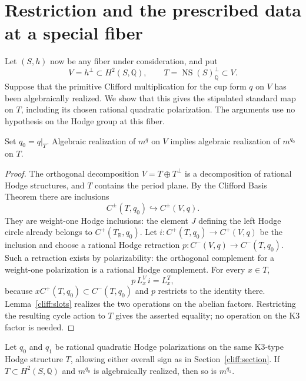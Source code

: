 \section{Restriction and the prescribed data at a special fiber}
\label{data:section}

Let $(S,h)$ now be any fiber under consideration, and put
\[
 V=h^\perp\subset H^2(S,\mathbb Q),\qquad
 T=\operatorname{NS}(S)_{\mathbb Q}^{\perp}\subset V.
\]
Suppose that the primitive Clifford multiplication for the cup form
$q$ on $V$ has been algebraically realized. We show that this gives
the stipulated standard map on $T$, including its chosen rational
quadratic polarization. The arguments use no hypothesis on the
Hodge group at this fiber.

\begin{proposition}
\label{data:restriction}
Set $q_0=q|_T$. Algebraic realization of $m^q$ on $V$ implies
algebraic realization of $m^{q_0}$ on $T$.
\end{proposition}

\begin{proof}
The orthogonal decomposition $V=T\oplus T^\perp$ is a decomposition
of rational Hodge structures, and $T$ contains the period plane.
By the Clifford Basis Theorem there are inclusions
\[
 C^\pm(T,q_0)\hookrightarrow C^\pm(V,q).
\]
They are weight-one Hodge inclusions: the element $J$ defining the
left Hodge circle already belongs to $C^+(T_{\mathbb R},q_0)$.
Let $i:C^+(T,q_0)\to C^+(V,q)$ be the inclusion and choose a rational
Hodge retraction $p:C^-(V,q)\to C^-(T,q_0)$. Such a retraction
exists by polarizability: the orthogonal complement for a
weight-one polarization is a rational Hodge complement.
For every $x\in T$,
\begin{equation}\label{data:restriction-identity}
 p\,L_x^{V}\,i=L_x^{T},
\end{equation}
because $xC^+(T,q_0)\subset C^-(T,q_0)$ and $p$ restricts to the
identity there. Lemma~\ref{cliff:slots} realizes the two operations
on the abelian factors. Restricting the resulting cycle action to
$T$ gives the asserted equality; no operation on the K3 factor
is needed.
\end{proof}

\begin{proposition}
\label{data:polarization}
Let $q_0$ and $q_1$ be rational quadratic Hodge polarizations on
the same K3-type Hodge structure $T$, allowing either overall sign
as in Section~\ref{cliff:section}. If $T\subset H^2(S,\mathbb Q)$
and $m^{q_0}$ is algebraically realized, then so is $m^{q_1}$.
\end{proposition}

